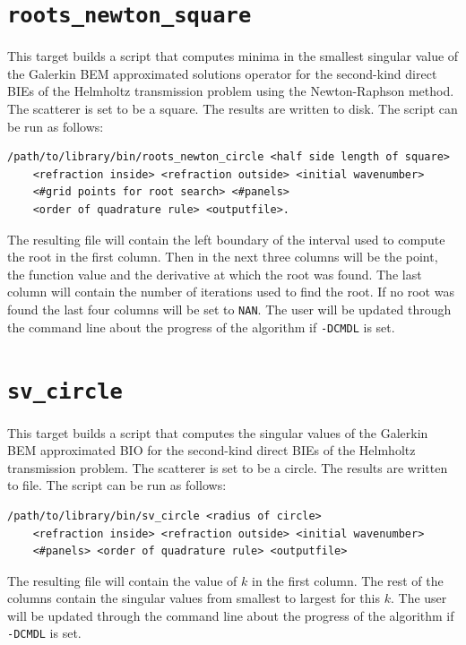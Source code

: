 \documentclass[a4paper, oneside]{thirdparty_stylesheets/discothesis}
\begin{document}
\cprotect\section{\verb|roots_newton_square|}
This target builds a script that computes minima in the smallest singular value of the
Galerkin BEM approximated solutions operator for the second-kind direct BIEs of the Helmholtz
transmission problem using the Newton-Raphson method.
The scatterer is set to be a square.
The results are written to disk.
The script can be run as follows:
\begin{verbatim}
/path/to/library/bin/roots_newton_circle <half side length of square> 
	<refraction inside> <refraction outside> <initial wavenumber> 
	<#grid points for root search> <#panels> 
	<order of quadrature rule> <outputfile>.
\end{verbatim}
The resulting file will contain the left boundary of the interval used to compute the root in the first column. 
Then in the next three columns will be the point, the function value and the derivative at which the root was found.
The last column will contain the number of iterations used to find the root.
If no root was found the last four columns will be set to \verb|NAN|.
The user will be updated through the command line about the progress of the algorithm if \verb|-DCMDL| is set.

\cprotect\section{\verb|sv_circle|}
This target builds a script that computes the singular values
of the Galerkin BEM approximated BIO for the
second-kind direct BIEs of the Helmholtz
transmission problem.
The scatterer is set to be a circle.
The results are written to file.
The script can be run as follows:
\begin{verbatim}
/path/to/library/bin/sv_circle <radius of circle> 
	<refraction inside> <refraction outside> <initial wavenumber>
	<#panels> <order of quadrature rule> <outputfile>
\end{verbatim}
The resulting file will contain the value of $k$ in the first column.
The rest of the columns contain the singular values from smallest to largest for this $k$.
The user will be updated through the command line about the progress of the algorithm if \verb|-DCMDL| is set.
\end{document}

